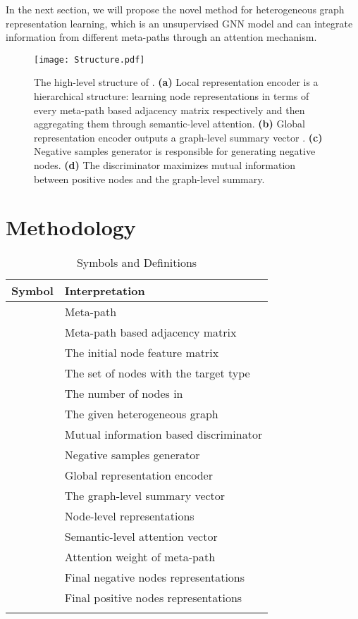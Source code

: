 \documentclass[conference]{IEEEtran}
\begin{document}
	In the next section, we will propose the novel method {\our} for heterogeneous graph representation learning, which is an unsupervised GNN model and can integrate information from different meta-paths through an attention mechanism.
	
\begin{figure*}[t]
		\centering
\texttt{[image: Structure.pdf]}
\captionsetup{singlelinecheck = false, format= hang, justification=raggedright, font=normalsize, labelsep=space}
		\caption{The high-level structure of {\our}. \textbf{(a)} Local representation encoder is a hierarchical structure: learning node representations in terms of every meta-path based adjacency matrix respectively and then aggregating them through semantic-level attention. \textbf{(b)} Global representation encoder  outputs a graph-level summary vector . \textbf{(c)} Negative samples generator  is responsible for generating negative nodes. \textbf{(d)} The discriminator  maximizes mutual information between positive nodes and the graph-level summary.}
		\label{fig:framework}
		
\end{figure*}
\section{{\our} Methodology}
	\label{sec:solution}


	


	
	
\begin{table}[h]
\centering
		\caption{Symbols and Definitions}
\begin{tabular}{ll}
			\toprule
			Symbol & Interpretation  \\
			\midrule
			 & Meta-path\\
			 & Meta-path based adjacency matrix\\
			 & The initial node feature matrix\\
 & The set of nodes with the target type\\
			 & The number of nodes in \\
			 & The given heterogeneous graph \\
			 & Mutual information based discriminator\\
			 & Negative samples generator\\
			 &Global representation encoder\\
			 & The graph-level summary vector \\
			 & Node-level representations \\
			 & Semantic-level attention vector \\
			 & Attention weight of meta-path \\
			 & Final negative nodes representations \\
			 & Final positive nodes representations \\
			\bottomrule
			\label{tab:notation}
			\vspace{-20pt}
		\end{tabular}
	\end{table}
\end{document}
